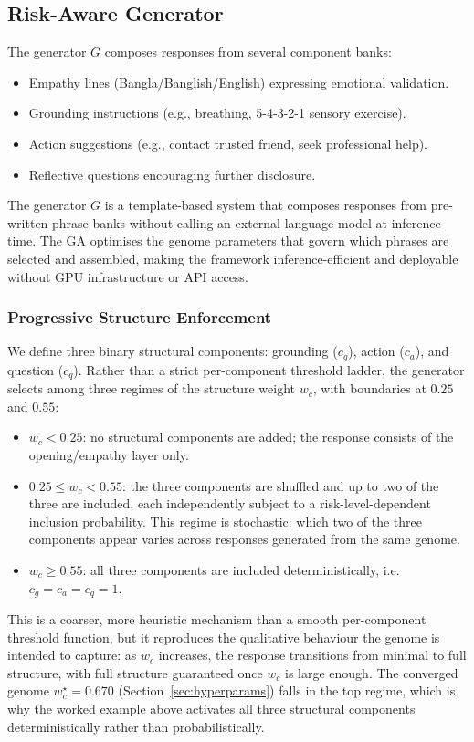\documentclass[mathematics,article,xetex,moreauthors]{Definitions/mdpi}
\begin{document}
\subsection{Risk-Aware Generator}
\label{sec:generator}

The generator \(G\) composes responses from several component banks:
\begin{itemize}
  \item Empathy lines (Bangla/Banglish/English) expressing emotional validation.
  \item Grounding instructions (e.g., breathing, 5-4-3-2-1 sensory exercise).
  \item Action suggestions (e.g., contact trusted friend, seek professional
        help).
  \item Reflective questions encouraging further disclosure.
\end{itemize}

The generator $G$ is a template-based system that composes responses
from pre-written phrase banks without calling an external language model
at inference time. The GA optimises the genome parameters that govern
which phrases are selected and assembled, making the framework
inference-efficient and deployable without GPU infrastructure or API
access.

\subsubsection{Progressive Structure Enforcement}
\label{sec:progressive-structure}

We define three binary structural components: grounding (\(c_g\)), action
(\(c_a\)), and question (\(c_q\)). Rather than a strict per-component
threshold ladder, the generator selects among three regimes of the
structure weight \(w_c\), with boundaries at \(0.25\) and \(0.55\):
\begin{itemize}
  \item \(w_c < 0.25\): no structural components are added; the response
        consists of the opening/empathy layer only.
  \item \(0.25 \le w_c < 0.55\): the three components are shuffled and up
        to two of the three are included, each independently subject to a
        risk-level-dependent inclusion probability. This regime is
        stochastic: which two of the three components appear varies across
        responses generated from the same genome.
  \item \(w_c \ge 0.55\): all three components are included deterministically,
        i.e. \(c_g = c_a = c_q = 1\).
\end{itemize}
This is a coarser, more heuristic mechanism than a smooth per-component
threshold function, but it reproduces the qualitative behaviour the genome
is intended to capture: as \(w_c\) increases, the response transitions from
minimal to full structure, with full structure guaranteed once \(w_c\) is
large enough. The converged genome \(w_c^{\star} = 0.670\)
(Section~\ref{sec:hyperparams}) falls in the top regime, which is why the
worked example above activates all three structural components
deterministically rather than probabilistically.
\end{document}

